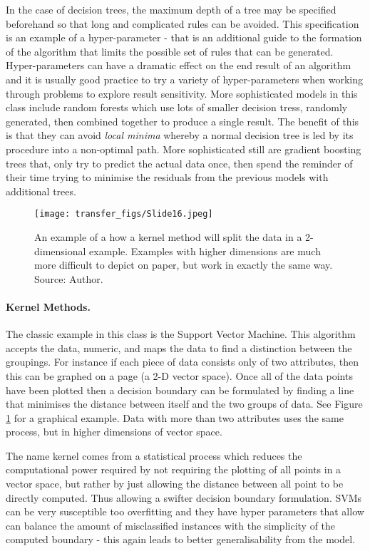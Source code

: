 In the case of decision trees, the maximum depth of a tree may be specified beforehand so that long and complicated rules can be avoided. This specification is an example of a hyper-parameter - that is an additional guide to the formation of the algorithm that limits the possible set of rules that can be generated. Hyper-parameters can have a dramatic effect on the end result of an algorithm and it is usually good practice to try a variety of hyper-parameters when working through problems to explore result sensitivity.  More sophisticated models in this class include random forests  which use lots of smaller decision tress, randomly generated,  then combined together to produce a single result. The benefit of this is that they can avoid \emph{local minima} whereby a normal decision tree is led by its procedure into a non-optimal path. More sophisticated still are gradient boosting trees that, only try to predict the actual data once, then spend the reminder of their time trying to minimise the residuals from the previous models with additional trees.  

\begin{figure}
  \texttt{[image: transfer\_figs/Slide16.jpeg]}
  \caption[Kernel Methods Example.]{An example of a how a kernel method will split the data in a 2-dimensional example. Examples with higher dimensions are much more difficult to depict on paper, but work in exactly the same way. Source: Author.}
  \label{fig:svm}
\end{figure}

\paragraph{Kernel Methods.} The classic example in this class is the Support Vector Machine. This algorithm accepts the data, numeric, and maps the data to find a distinction between the groupings. For instance if each piece of data consists only of two attributes, then this can be graphed on a page (a 2-D vector space). Once all of the data points have been plotted then a decision boundary can be formulated by finding a line that minimises the distance between itself and the two groups of data. See Figure \ref{fig:svm} for a graphical example. Data with more than two attributes uses the same process, but in higher dimensions of vector space. 

The name kernel comes from a statistical process which reduces the computational power required by not requiring the plotting of all points in a vector space, but rather by just allowing the distance between all point to be directly computed. Thus allowing a swifter decision boundary formulation. SVMs can be very susceptible too overfitting and they have hyper parameters that allow can balance the amount of misclassified instances with the simplicity of the computed boundary - this again leads to better generalisability from the model. 


